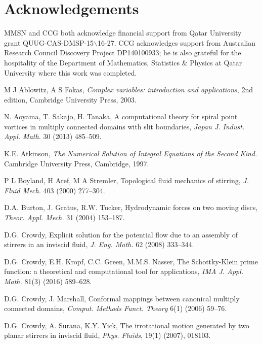 \documentclass[11pt,a4paper]{article}
\begin{document}
\section*{Acknowledgements}

MMSN and CCG both acknowledge financial support from Qatar University
grant QUUG-CAS-DMSP-15$\backslash$16-27. CCG acknowledges support from Australian
Research Council Discovery Project DP140100933; he is also grateful
for the hospitality of the Department of Mathematics, Statistics \&
Physics at Qatar University where this work was completed.


\begin{thebibliography}{00}

M J Ablowitz, A S Fokas, \emph{Complex variables: introduction and applications}, 2nd edition, Cambridge University Press, 2003.

N. Aoyama, T. Sakajo, H. Tanaka, A computational theory for spiral point vortices in multiply connected domains with slit boundaries, \emph{Japan J. Indust. Appl. Math.} 30 (2013) 485--509.

K.E. Atkinson, \emph{The Numerical Solution of Integral Equations of the Second Kind.} Cambridge University Press, Cambridge, 1997.

P L Boyland, H Aref, M A Stremler, Topological fluid mechanics of stirring, \emph{J. Fluid Mech.} 403 (2000)  277--304.

D.A. Burton, J. Gratus, R.W. Tucker, Hydrodynamic forces on two moving discs, \emph{Theor. Appl. Mech.} 31 (2004) 153--187.

D.G. Crowdy,
Explicit solution for the potential flow due to an assembly of stirrers in an inviscid fluid, \emph{J. Eng. Math.} 62 (2008) 333--344.

D.G. Crowdy, E.H. Kropf, C.C. Green, M.M.S. Nasser, The Schottky-Klein prime function: a theoretical and computational tool for applications, \emph{IMA J. Appl. Math.} 81(3) (2016) 589--628.

D.G. Crowdy, J. Marshall, Conformal mappings between canonical multiply connected domains, \emph{Comput. Methods Funct. Theory} 6(1) (2006) 59--76.

D.G. Crowdy, A. Surana, K.Y. Yick, The irrotational motion generated by two planar stirrers in inviscid fluid, \emph{Phys. Fluids}, 19(1) (2007), 018103.


\end{thebibliography}
\end{document}
